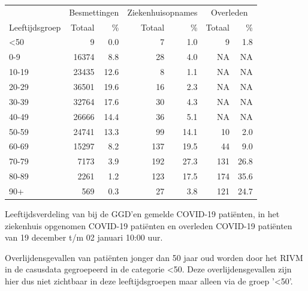 \documentclass[
  english,
  man,floatsintext]{apa6}
\begin{document}
\begin{table}
\centering\begingroup\fontsize{11}{13}\selectfont

\begin{threeparttable}
\begin{tabular}{lrrrrrr}
\toprule
\multicolumn{1}{c}{ } & \multicolumn{2}{c}{Besmettingen} & \multicolumn{2}{c}{Ziekenhuisopnames} & \multicolumn{2}{c}{Overleden} \\
\cmidrule(l{3pt}r{3pt}){2-3} \cmidrule(l{3pt}r{3pt}){4-5} \cmidrule(l{3pt}r{3pt}){6-7}
Leeftijdsgroep & Totaal & \% & Totaal & \% & Totaal & \%\\
\midrule
<50 & 9 & 0.0 & 7 & 1.0 & 9 & 1.8\\
0-9 & 16374 & 8.8 & 28 & 4.0 & NA & NA\\
10-19 & 23435 & 12.6 & 8 & 1.1 & NA & NA\\
20-29 & 36501 & 19.6 & 16 & 2.3 & NA & NA\\
30-39 & 32764 & 17.6 & 30 & 4.3 & NA & NA\\
40-49 & 26666 & 14.4 & 36 & 5.1 & NA & NA\\
50-59 & 24741 & 13.3 & 99 & 14.1 & 10 & 2.0\\
60-69 & 15297 & 8.2 & 137 & 19.5 & 44 & 9.0\\
70-79 & 7173 & 3.9 & 192 & 27.3 & 131 & 26.8\\
80-89 & 2261 & 1.2 & 123 & 17.5 & 174 & 35.6\\
90+ & 569 & 0.3 & 27 & 3.8 & 121 & 24.7\\
\bottomrule
\end{tabular}
\begin{tablenotes}
\item[1] Leeftijdsverdeling van bij de GGD’en gemelde COVID-19 patiënten, in het ziekenhuis opgenomen COVID-19 patiënten en overleden COVID-19 patiënten van 19 december t/m 02 januari 10:00 uur.
\item[2] Overlijdensgevallen van patiënten jonger dan 50 jaar oud worden door het RIVM in de casusdata gegroepeerd in de categorie <50. Deze overlijdensgevallen zijn hier dus niet zichtbaar in deze leeftijdsgroepen maar alleen via de groep '<50'.
\end{tablenotes}
\end{threeparttable}
\endgroup{}
\end{table}

\newpage
\end{document}
